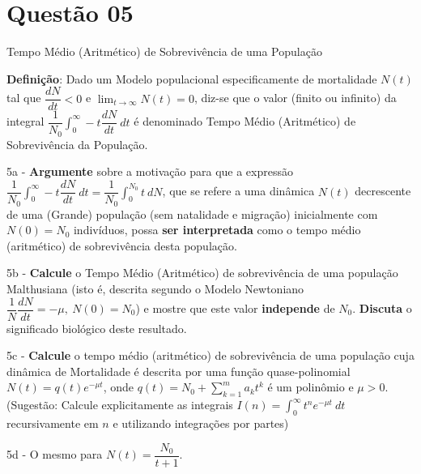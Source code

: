 \section*{Questão 05}


Tempo Médio (Aritmético) de Sobrevivência de uma População

    \textbf{Definição}: Dado um Modelo populacional especificamente de mortalidade \(N(t)\) tal que \(\dfrac{dN}{dt} < 0\) e \(\displaystyle \lim_{t \to \infty} N(t) = 0\), diz-se que o valor (finito ou infinito) da integral \(\dfrac{1}{N_0} \displaystyle\int_{0}^{\infty} -t \dfrac{dN}{dt}\ dt\) é denominado Tempo Médio (Aritmético) de Sobrevivência da População.

    5a - \textbf{Argumente} sobre a motivação para que a expressão
    \(\dfrac{1}{N_0} \displaystyle\int_{0}^{\infty} -t \dfrac{dN}{dt}\ dt = \dfrac{1}{N_0} \displaystyle\int_{0}^{N_0} t \ dN\), que se refere a uma dinâmica \(N(t)\) decrescente de uma (Grande) população (sem natalidade e migração) inicialmente com \(N(0) = N_0\) indivíduos, possa \textbf{ser interpretada} como o tempo médio (aritmético) de sobrevivência desta população.

    5b - \textbf{Calcule} o Tempo Médio (Aritmético) de sobrevivência de uma população Malthusiana (isto é, descrita segundo o Modelo Newtoniano \(\dfrac{1}{N} \dfrac{dN}{dt} = -\mu,\ N(0) = N_0\)) e mostre que este valor \textbf{independe} de \(N_0\). \textbf{Discuta} o significado biológico deste resultado.

    5c - \textbf{Calcule} o tempo médio (aritmético) de sobrevivência de uma população cuja dinâmica de Mortalidade é descrita por uma função quase-polinomial \(N(t) = q(t)e^{-\mu t}\), onde \(q(t) = N_0 + \displaystyle \sum_{k = 1}^{m} a_k t^k\) é um polinômio e \(\mu > 0\). (Sugestão: Calcule explicitamente as integrais \(I(n) = \int_{0}^{\infty} t^n e^{-\mu t}\ dt\) recursivamente em \(n\) e utilizando integrações por partes)

    5d - O mesmo para \(N(t) = \dfrac{N_0}{t+1}\).


